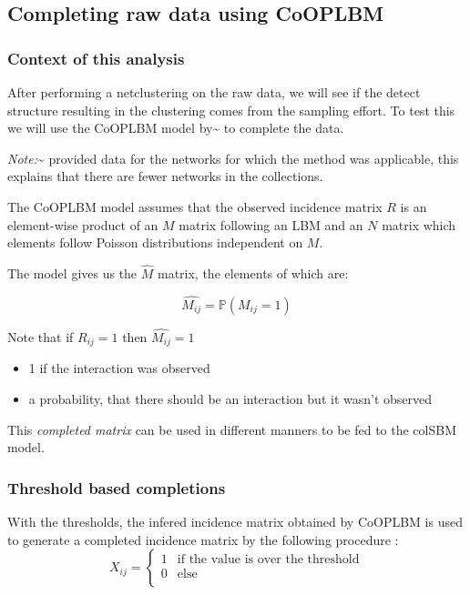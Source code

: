\subsection{Completing raw data using CoOPLBM~\parencite{anakokDisentanglingStructureEcological2022}}

\hypertarget{context-of-this-analysis}{%
\subsubsection{Context of this
analysis}\label{context-of-this-analysis}}

After performing a netclustering on the raw data, we will see if the
detect structure resulting in the clustering comes from the sampling
effort. To test this we will use the CoOPLBM model
by\textasciitilde{}\cite{anakokDisentanglingStructureEcological2022} to
complete the data.

\emph{Note:}\textasciitilde{}\cite{anakokDisentanglingStructureEcological2022}
provided data for the networks for which the method was applicable, this
explains that there are fewer networks in the collections.

The CoOPLBM model assumes that the observed incidence matrix \(R\) is an
element-wise product of an \(M\) matrix following an LBM and an \(N\)
matrix which elements follow Poisson distributions independent on \(M\).

The model gives us the \(\widehat{M}\) matrix, the elements of which
are:

\[\widehat{M_{ij}} = \mathbb{P}(M_{ij} = 1)\]

Note that if \(R_{ij} = 1\) then \(\widehat{M_{ij}} = 1\)

\begin{itemize}
\tightlist
\item
  1 if the interaction was observed
\item
  a probability, that there should be an interaction but it wasn't
  observed
\end{itemize}

This \emph{completed matrix} can be used in different manners to be fed
to the colSBM model.

\hypertarget{threshold-based-completions}{%
\subsubsection{Threshold based
completions}\label{threshold-based-completions}}

With the thresholds, the infered incidence matrix obtained by CoOPLBM is
used to generate a completed incidence matrix by the following procedure
: \[X_{ij} = \begin{cases}
  1 & \text{if the value is over the threshold} \\
  0 & \text{else} \\
\end{cases}\]

